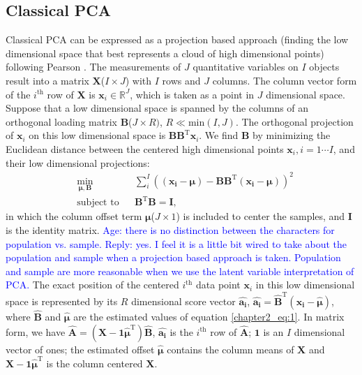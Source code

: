 \subsection{Classical PCA}
Classical PCA can be expressed as a projection based approach (finding the low dimensional space that best represents a cloud of high dimensional points) following Pearson \cite{pearson1901lines}. The measurements of $J$ quantitative variables on $I$ objects result into a matrix $\mathbf{X}$($I \times J$) with $I$ rows and $J$ columns. The column vector form of the $i^{\text{th}}$ row of $\mathbf{X}$ is $\mathbf{x}_i \in \mathbb{R}^J$, which is taken as a point in $J$ dimensional space. Suppose that a low dimensional space is spanned by the columns of an orthogonal loading matrix $\mathbf{B}$($J \times R)$, $R \ll \text{min}(I,J)$. The orthogonal projection of $\mathbf{x}_i$ on this low dimensional space is $\mathbf{B}\mathbf{B}^{\text{T}}\mathbf{x}_i$. We find $\mathbf{B}$ by minimizing the Euclidean distance between the centered high dimensional points $\mathbf{x}_i, i=1\cdots I$, and their low dimensional projections:
\begin{equation}\label{chapter2_eq:1}
\begin{aligned}
& \underset{\bm{\mu},\mathbf{B}}{\text{min}}
& &\sum_{i}^{I}((\mathbf{x_i} - \bm{\mu}) - \mathbf{BB}^{\text{T}}(\mathbf{x_i} - \bm{\mu}))^{2}\\
& \text{subject to}
& &\mathbf{B}^{\text{T}}\mathbf{B} = \mathbf{I},
\end{aligned}
\end{equation}
in which the column offset term $\bm{\mu}$($J \times 1$) is included to center the samples, and $\mathbf{I}$ is the identity matrix. \textcolor{blue}{Age: there is no distinction between the characters for population vs. sample. Reply: yes. I feel it is a little bit wired to take about the population and sample when a projection based approach is taken. Population and sample are more reasonable when we use the latent variable interpretation of PCA.} The exact position of the centered $i^{\text{th}}$ data point $\mathbf{x}_i$ in this low dimensional space is represented by its $R$ dimensional score vector $\hat{\mathbf{a_i}}$, $\hat{\mathbf{a_{i}}} = \hat{\mathbf{B}}^{\text{T}}( \mathbf{x_i} - \hat{\bm{\mu}})$, where $\hat{\mathbf{B}}$ and $\hat{\bm{\mu}}$ are the estimated values of equation \ref{chapter2_eq:1}. In matrix form, we have $\hat{\mathbf{A}}=(\mathbf{X} - \mathbf{1}\hat{\bm{\mu}}^{\text{T}})\hat{\mathbf{B}}$, $\hat{\mathbf{a_i}}$ is the $i^{\text{th}}$ row of $\hat{\mathbf{A}}$; $\mathbf{1}$ is an $I$ dimensional vector of ones; the estimated offset $\hat{\bm{\mu}}$ contains the column means of $\mathbf{X}$ and $\mathbf{X} - \mathbf{1}\hat{\bm{\mu}}^{\text{T}}$ is the column centered $\mathbf{X}$.


